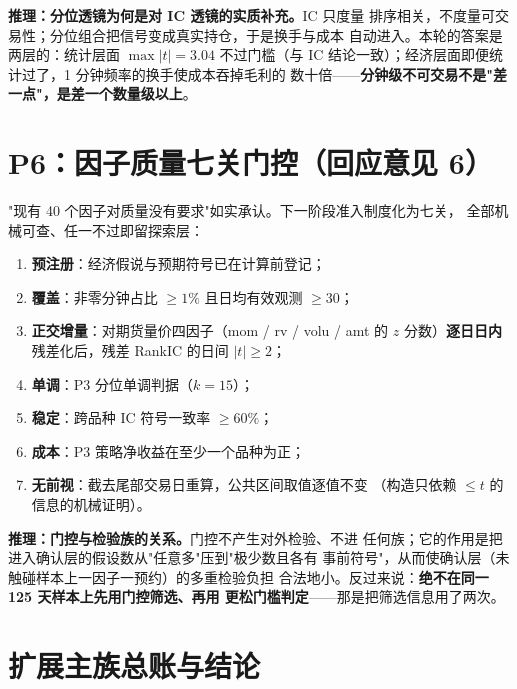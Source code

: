 \documentclass[11pt, a4paper]{ctexart}
\begin{document}
\noindent\textbf{推理：分位透镜为何是对 IC 透镜的实质补充。}IC 只度量
排序相关，不度量可交易性；分位组合把信号变成真实持仓，于是换手与成本
自动进入。本轮的答案是两层的：统计层面 $\max|t|=3.04$ 不过门槛（与 IC
结论一致）；经济层面即便统计过了，1 分钟频率的换手使成本吞掉毛利的
数十倍——\textbf{分钟级不可交易不是"差一点"，是差一个数量级以上}。

\section{P6：因子质量七关门控（回应意见 6）}\label{sec:p6}

"现有 40 个因子对质量没有要求"如实承认。下一阶段准入制度化为七关，
全部机械可查、任一不过即留探索层：

\begin{enumerate}
\item \textbf{预注册}：经济假说与预期符号已在计算前登记；
\item \textbf{覆盖}：非零分钟占比 $\ge1\%$ 且日均有效观测 $\ge30$；
\item \textbf{正交增量}：对期货量价四因子（mom / rv / volu / amt 的
  $z$ 分数）\textbf{逐日日内}残差化后，残差 RankIC 的日间 $|t|\ge2$；
\item \textbf{单调}：P3 分位单调判据（$k{=}15$）；
\item \textbf{稳定}：跨品种 IC 符号一致率 $\ge60\%$；
\item \textbf{成本}：P3 策略净收益在至少一个品种为正；
\item \textbf{无前视}：截去尾部交易日重算，公共区间取值逐值不变
  （构造只依赖 $\le t$ 的信息的机械证明）。
\end{enumerate}

\begin{table}[h!]\centering\small
\caption{首批候选（6 个分散度因子）的七关矩阵：无一全过（各过
3--4 关），全部留探索层。门控真实生效，不是摆设}

\end{table}

\noindent\textbf{推理：门控与检验族的关系。}门控不产生对外检验、不进
任何族；它的作用是把进入确认层的假设数从"任意多"压到"极少数且各有
事前符号"，从而使确认层（未触碰样本上一因子一预约）的多重检验负担
合法地小。反过来说：\textbf{绝不在同一 125 天样本上先用门控筛选、再用
更松门槛判定}——那是把筛选信息用了两次。

\section{扩展主族总账与结论}\label{sec:ledger}
\end{document}
